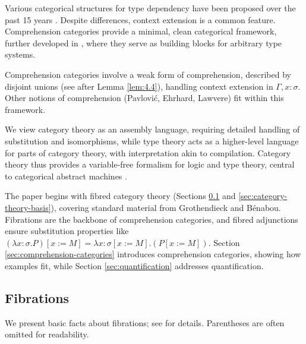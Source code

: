 \documentclass{article}
\begin{document}
Various categorical structures for type dependency have been proposed
over the past 15 years \cite{Cartmell1978, Seely1984, Taylor1986,
Lamarche1988, HylandPitts1989, Moggi1991, Pavlovic1990}. Despite
differences, context extension is a common feature. Comprehension
categories provide a minimal, clean categorical framework, further
developed in \cite{Jacobs1991, JacobsMoggiStreicher1991}, where they
serve as building blocks for arbitrary type systems.

Comprehension categories involve a weak form of comprehension,
described by disjoint unions (see after Lemma \ref{lem:4.4}),
handling context extension in $\Gamma, x : \sigma$. Other notions
of comprehension (Pavlović, Ehrhard, Lawvere) fit within this framework.

We view category theory as an assembly language, requiring detailed
handling of substitution and isomorphisms, while type theory acts as
a higher-level language for parts of category theory, with
interpretation akin to compilation. Category theory thus provides
a variable-free formalism for logic and type theory, central to
categorical abstract machines \cite{Curien1986, Curien1989}.

The paper begins with fibred category theory (Sections \ref{sec:fibrations}
and \ref{sec:category-theory-basis}), covering standard material from
Grothendieck and Bénabou. Fibrations are the backbone of comprehension
categories, and fibred adjunctions ensure substitution properties
like $(\lambda x : \sigma . P)[x := M] = \lambda x : \sigma[x := M] . (P[x := M])$.
Section \ref{sec:comprehension-categories} introduces comprehension categories,
showing how examples fit, while Section \ref{sec:quantification} addresses quantification.

\newpage
\subsection{Fibrations}
\label{sec:fibrations}

We present basic facts about fibrations;
see \cite{Benabou1985, Giraud1971, Gray1966, Grothendieck1971}
for details. Parentheses are often omitted for readability.
\end{document}
